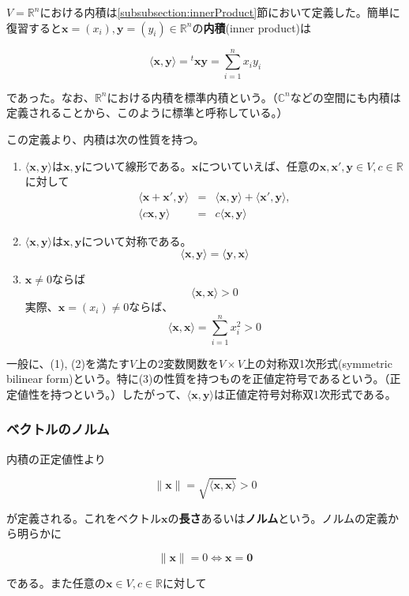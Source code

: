 \documentclass[dvipdfmx,autodetect-engine]{jsarticle}
\theoremstyle{definition}
\newcommand{\innerProduct}[2]{\langle \bm{#1}, \bm{#2} \rangle}
\newcommand{\transposeVec}[1]{{}^t\!{\bm{#1}}}
\newcommand{\vecSpace}[1]{\mathbb{R}^{#1}}
\begin{document}
$V = \vecSpace{n}$における内積は\ref{subsubsection:innerProduct}節において定義した。簡単に復習すると$\bm{x} = (x_i), \bm{y} = (y_i) \in \vecSpace{n}$の{\bf 内積}(inner product)は

$$
\innerProduct{x}{y} = \transposeVec{x}\bm{y} = \sum_{i = 1}^n x_iy_i
$$

であった。なお、$\vecSpace{n}$における内積を標準内積という。（$\mathbb{C}^n$などの空間にも内積は定義されることから、このように標準と呼称している。）

この定義より、内積は次の性質を持つ。

\begin{enumerate}
\renewcommand{\labelenumi}{(\arabic{enumi})}
\item $\innerProduct{x}{y}$は$\bm{x}, \bm{y}$について線形である。$\bm{x}$についていえば、任意の$\bm{x}, \bm{x}', \bm{y} \in V, c \in \mathbb{R}$に対して
\begin{eqnarray*}
\langle \bm{x} + \bm{x}', \bm{y} \rangle &= &\innerProduct{x}{y} + \innerProduct{x'}{y}, \\
\langle c\bm{x}, \bm{y} \rangle &= &c\innerProduct{x}{y}
\end{eqnarray*}
\item $\innerProduct{x}{y}$は$\bm{x}, \bm{y}$について対称である。
$$
\innerProduct{x}{y} = \innerProduct{y}{x}
$$
\item $\bm{x} \neq 0$ならば
$$
\innerProduct{x}{x} > 0
$$
実際、$\bm{x} = (x_i) \neq 0$ならば、
$$
\innerProduct{x}{x} = \sum_{i = 1}^n x_i^2 > 0
$$
\end{enumerate}

一般に、(1), (2)を満たす$V$上の2変数関数を$V \times V$上の対称双1次形式(symmetric bilinear form)という。特に(3)の性質を持つものを正値定符号であるという。（正定値性を持つという。）したがって、$\innerProduct{x}{y}$は正値定符号対称双1次形式である。

\subsubsection{ベクトルのノルム}

内積の正定値性より

$$
\|\bm{x}\| = \sqrt{\innerProduct{x}{x}} > 0
$$

が定義される。これをベクトル$\bm{x}$の{\bf 長さ}あるいは{\bf ノルム}という。ノルムの定義から明らかに

$$
\|\bm{x}\| = 0 \Longleftrightarrow \bm{x} = \bm{0}
$$

である。また任意の$\bm{x} \in V, c \in \mathbb{R}$に対して
\end{document}
